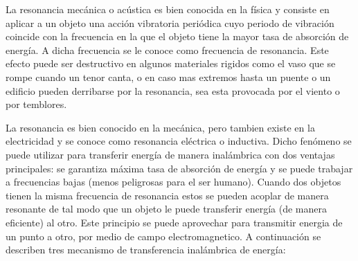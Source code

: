\documentclass{intech}
\begin{document}
La resonancia mec\'anica o ac\'ustica es bien conocida en la f{\'i}sica y consiste en aplicar a un objeto una acci\'on vibratoria peri\'odica cuyo periodo de vibraci\'on coincide con la frecuencia en la que el objeto tiene la mayor tasa de absorci\'on de energ{\'i}a. A dicha frecuencia se le conoce como frecuencia de resonancia. 
Este efecto puede ser destructivo en algunos materiales rigidos como el vaso que se rompe cuando un tenor canta,
o en caso mas extremos hasta un puente o un edificio pueden derribarse por la resonancia, sea esta provocada por el viento
o por temblores.

La resonancia es bien conocido en la mec\'anica, pero tambien existe en la electricidad y se conoce como resonancia el\'ectrica o inductiva. Dicho fen\'omeno se puede utilizar para transferir energ{\'i}a de manera inal\'ambrica con dos ventajas principales: se garantiza m\'axima  tasa de absorci\'on de energ{\'i}a  y se puede trabajar a frecuencias bajas (menos peligrosas para el ser humano). Cuando dos objetos tienen la misma frecuencia de resonancia estos se pueden acoplar de manera resonante de tal modo que un objeto le puede transferir energ{\'i}a (de manera eficiente) al otro. Este principio se puede aprovechar para transmitir energia 
de un punto a otro, por
medio de campo electromagnetico. A continuaci\'on se describen tres mecanismo de transferencia inal\'ambrica de energ{\'i}a:
\end{document}
